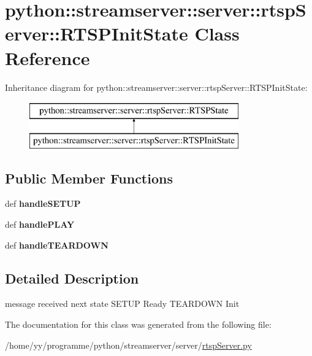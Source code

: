 \hypertarget{classpython_1_1streamserver_1_1server_1_1rtspServer_1_1RTSPInitState}{
\section{python::streamserver::server::rtspServer::RTSPInitState Class Reference}
\label{classpython_1_1streamserver_1_1server_1_1rtspServer_1_1RTSPInitState}
}
Inheritance diagram for python::streamserver::server::rtspServer::RTSPInitState:\begin{figure}[H]
\begin{center}
\leavevmode
\includegraphics[height=2.000000cm]{classpython_1_1streamserver_1_1server_1_1rtspServer_1_1RTSPInitState}
\end{center}
\end{figure}
\subsection*{Public Member Functions}
\begin{DoxyCompactItemize}
\item 
\hypertarget{classpython_1_1streamserver_1_1server_1_1rtspServer_1_1RTSPInitState_ae3bae13f081bcffe0826f0ff3a1ef3bd}{
def {\bfseries handleSETUP}}
\label{classpython_1_1streamserver_1_1server_1_1rtspServer_1_1RTSPInitState_ae3bae13f081bcffe0826f0ff3a1ef3bd}

\item 
\hypertarget{classpython_1_1streamserver_1_1server_1_1rtspServer_1_1RTSPInitState_acddd622ba247fcbf69e81a15b7e47199}{
def {\bfseries handlePLAY}}
\label{classpython_1_1streamserver_1_1server_1_1rtspServer_1_1RTSPInitState_acddd622ba247fcbf69e81a15b7e47199}

\item 
\hypertarget{classpython_1_1streamserver_1_1server_1_1rtspServer_1_1RTSPInitState_aef7d512356f85d4b1e0aa9d603d1ede8}{
def {\bfseries handleTEARDOWN}}
\label{classpython_1_1streamserver_1_1server_1_1rtspServer_1_1RTSPInitState_aef7d512356f85d4b1e0aa9d603d1ede8}

\end{DoxyCompactItemize}


\subsection{Detailed Description}
\begin{DoxyVerb}message received    next state
        SETUP               Ready
        TEARDOWN            Init\end{DoxyVerb}
 

The documentation for this class was generated from the following file:\begin{DoxyCompactItemize}
\item 
/home/yy/programme/python/streamserver/server/\hyperlink{rtspServer_8py}{rtspServer.py}\end{DoxyCompactItemize}
